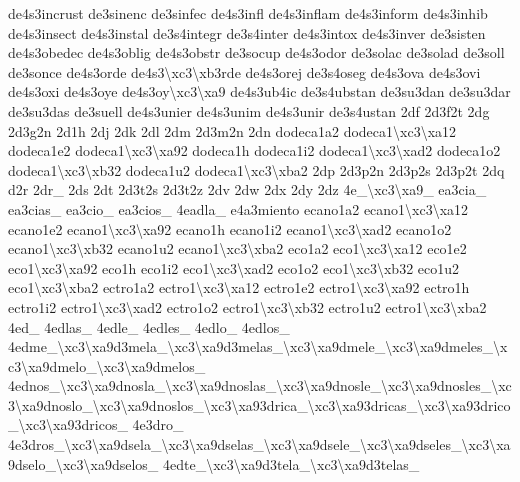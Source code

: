 {de4s3incrust de3sinenc de3sinfec de4s3infl de4s3inflam de4s3inform de4s3inhib de4s3insect de4s3instal de3s4integr de3s4inter de4s3intox de4s3inver de3sisten de4s3obedec de4s3oblig de4s3obstr de3socup de4s3odor de3solac de3solad de3soll de3sonce de4s3orde de4s3\textbackslash{}xc3\textbackslash{}xb3rde de4s3orej de3s4oseg de4s3ova de4s3ovi de4s3oxi de4s3oye de4s3oy\textbackslash{}xc3\textbackslash{}xa9 de4s3ub4ic de3s4ubstan de3su3dan de3su3dar de3su3das de3suell de4s3unier de4s3unim de4s3unir de3s4ustan 2df 2d3f2t 2dg 2d3g2n 2d1h 2dj 2dk 2dl 2dm 2d3m2n 2dn dodeca1a2 dodeca1\textbackslash{}xc3\textbackslash{}xa12 dodeca1e2 dodeca1\textbackslash{}xc3\textbackslash{}xa92 dodeca1h dodeca1i2 dodeca1\textbackslash{}xc3\textbackslash{}xad2 dodeca1o2 dodeca1\textbackslash{}xc3\textbackslash{}xb32 dodeca1u2 dodeca1\textbackslash{}xc3\textbackslash{}xba2 2dp 2d3p2n 2d3p2s 2d3p2t 2dq d2r 2dr\-\_\- 2ds 2dt 2d3t2s 2d3t2z 2dv 2dw 2dx 2dy 2dz 4e\-\_\textbackslash{}xc3\textbackslash{}xa9\-\_\- ea3cia\-\_\- ea3cias\-\_\- ea3cio\-\_\- ea3cios\-\_\- 4eadla\-\_\- e4a3miento ecano1a2 ecano1\textbackslash{}xc3\textbackslash{}xa12 ecano1e2 ecano1\textbackslash{}xc3\textbackslash{}xa92 ecano1h ecano1i2 ecano1\textbackslash{}xc3\textbackslash{}xad2 ecano1o2 ecano1\textbackslash{}xc3\textbackslash{}xb32 ecano1u2 ecano1\textbackslash{}xc3\textbackslash{}xba2 eco1a2 eco1\textbackslash{}xc3\textbackslash{}xa12 eco1e2 eco1\textbackslash{}xc3\textbackslash{}xa92 eco1h eco1i2 eco1\textbackslash{}xc3\textbackslash{}xad2 eco1o2 eco1\textbackslash{}xc3\textbackslash{}xb32 eco1u2 eco1\textbackslash{}xc3\textbackslash{}xba2 ectro1a2 ectro1\textbackslash{}xc3\textbackslash{}xa12 ectro1e2 ectro1\textbackslash{}xc3\textbackslash{}xa92 ectro1h ectro1i2 ectro1\textbackslash{}xc3\textbackslash{}xad2 ectro1o2 ectro1\textbackslash{}xc3\textbackslash{}xb32 ectro1u2 ectro1\textbackslash{}xc3\textbackslash{}xba2 4ed\-\_\- 4edlas\-\_\- 4edle\-\_\- 4edles\-\_\- 4edlo\-\_\- 4edlos\-\_\- 4edme\-\_\textbackslash{}xc3\textbackslash{}xa9d3mela\-\_\textbackslash{}xc3\textbackslash{}xa9d3melas\-\_\textbackslash{}xc3\textbackslash{}xa9dmele\-\_\textbackslash{}xc3\textbackslash{}xa9dmeles\-\_\textbackslash{}xc3\textbackslash{}xa9dmelo\-\_\textbackslash{}xc3\textbackslash{}xa9dmelos\-\_\- 4ednos\-\_\textbackslash{}xc3\textbackslash{}xa9dnosla\-\_\textbackslash{}xc3\textbackslash{}xa9dnoslas\-\_\textbackslash{}xc3\textbackslash{}xa9dnosle\-\_\textbackslash{}xc3\textbackslash{}xa9dnosles\-\_\textbackslash{}xc3\textbackslash{}xa9dnoslo\-\_\textbackslash{}xc3\textbackslash{}xa9dnoslos\-\_\textbackslash{}xc3\textbackslash{}xa93drica\-\_\textbackslash{}xc3\textbackslash{}xa93dricas\-\_\textbackslash{}xc3\textbackslash{}xa93drico\-\_\textbackslash{}xc3\textbackslash{}xa93dricos\-\_\- 4e3dro\-\_\- 4e3dros\-\_\textbackslash{}xc3\textbackslash{}xa9dsela\-\_\textbackslash{}xc3\textbackslash{}xa9dselas\-\_\textbackslash{}xc3\textbackslash{}xa9dsele\-\_\textbackslash{}xc3\textbackslash{}xa9dseles\-\_\textbackslash{}xc3\textbackslash{}xa9dselo\-\_\textbackslash{}xc3\textbackslash{}xa9dselos\-\_\- 4edte\-\_\textbackslash{}xc3\textbackslash{}xa9d3tela\-\_\textbackslash{}xc3\textbackslash{}xa9d3telas\-\_\- }
